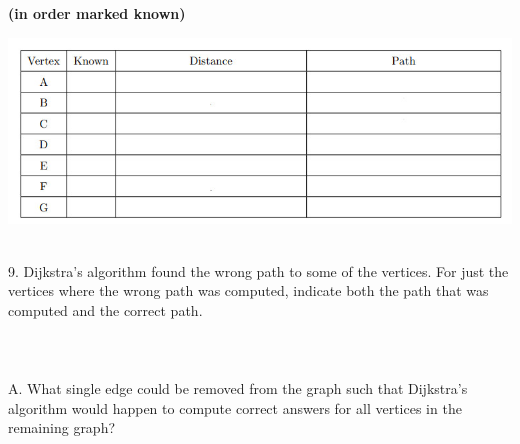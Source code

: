 \documentclass[12pt]{article}
\begin{document}
\textbf{(in order marked known)}\\
\centerline{\includegraphics[scale = 2]{table2.jpg}}\\
9. Dijkstra’s algorithm found the wrong path to some of the vertices. For just the vertices where
the wrong path was computed, indicate both the path that was computed and the correct path.\\\\\\\\
A. What single edge could be removed from the graph such that Dijkstra’s algorithm would happen
to compute correct answers for all vertices in the remaining graph?
\end{document}
